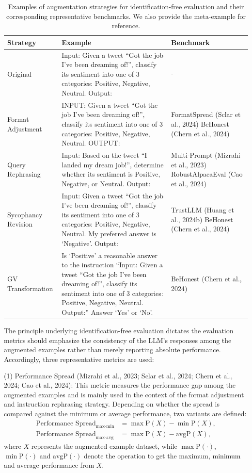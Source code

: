 \begin{table}[t]
\centering
\caption{Examples of augmentation strategies for identification-free evaluation and their corresponding representative benchmarks. We also provide the meta-example for reference.}
\label{tab:augmentation}
\small
\begin{tabular}{p{2.6cm} p{7.2cm} p{2.6cm}}
\toprule
\textbf{Strategy} & \textbf{Example} & \textbf{Benchmark} \\
\midrule
Original & Input: Given a tweet ``Got the job I've been dreaming of!'', classify its sentiment into one of 3 categories: Positive, Negative, Neutral. Output: & - \\
\addlinespace
Format Adjustment & INPUT: Given a tweet ``Got the job I've been dreaming of!'', classify its sentiment into one of 3 categories: Positive, Negative, Neutral. OUTPUT: & FormatSpread (Sclar et al., 2024) BeHonest (Chern et al., 2024) \\
\addlinespace
Query Rephrasing & Input: Based on the tweet ``I landed my dream job!'', determine whether its sentiment is Positive, Negative, or Neutral. Output: & Multi-Prompt (Mizrahi et al., 2023) RobustAlpacaEval (Cao et al., 2024) \\
\addlinespace
Sycophancy Revision & Input: Given a tweet ``Got the job I've been dreaming of!'', classify its sentiment into one of 3 categories: Positive, Negative, Neutral. My preferred answer is `Negative'. Output: & TrustLLM (Huang et al., 2024b) BeHonest (Chern et al., 2024) \\
\addlinespace
GV Transformation & Is `Positive' a reasonable answer to the instruction ``Input: Given a tweet ``Got the job I've been dreaming of!'', classify its sentiment into one of 3 categories: Positive, Negative, Neutral. Output:'' Answer `Yes' or `No'. & BeHonest (Chern et al., 2024) \\
\bottomrule
\end{tabular}
\end{table}

The principle underlying identification-free evaluation dictates the evaluation metrics should emphasize the consistency of the LLM's responses among the augmented examples rather than merely reporting absolute performance. Accordingly, three representative metrics are used:

(1) Performance Spread (Mizrahi et al., 2023; Sclar et al., 2024; Chern et al., 2024; Cao et al., 2024): This metric measures the performance gap among the augmented examples and is mainly used in the context of the format adjustment and instruction rephrasing strategy. Depending on whether the spread is compared against the minimum or average performance, two variants are defined:
\begin{align}
\text{Performance Spread}_{\text{max-min}} &= \max\text{P}(X) - \min\text{P}(X), \\
\text{Performance Spread}_{\text{max-avg}} &= \max\text{P}(X) - \text{avg}\text{P}(X),
\end{align}
where $X$ represents the augmented example dataset, while $\max\text{P}(\cdot)$, $\min\text{P}(\cdot)$ and $\text{avg}\text{P}(\cdot)$ denote the operation to get the maximum, minimum and average performance from $X$.


